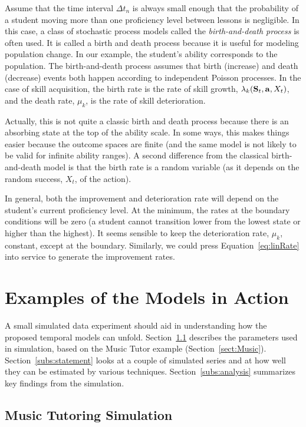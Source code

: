 \documentclass[12pt]{RR-article}
\begin{document}
Assume that the time interval $\Delta t_n$ is always small enough that
the probability of a student moving more than one proficiency level
between lessons is negligible.  In this case, a class of stochastic
process models called the \textit{birth-and-death process\/}
\cite{Ross1989} is often used.  It is called a birth and death process
because it is useful for modeling population change.  In our example,
the student's ability corresponds to the population.  The
birth-and-death process assumes that birth (increase) and death
(decrease) events both happen according to independent Poisson
processes.  In the case of skill acquisition, the birth rate is the
rate of skill growth, $\lambda_{k}({\bf S}_t,{\bf a}, X_t)$, and the
death rate, $\mu_k$, is the rate of skill deterioration.

Actually, this is not quite a classic birth and death process because
there is an absorbing state at the top of the ability scale.  In some
ways, this makes things easier because the outcome spaces are finite
(and the same model is not likely to be valid for infinite ability
ranges).  A second difference from the classical birth-and-death model
is that the birth rate is a random variable (as it depends on the
random success, $X_t$, of the action).

In general, both the improvement and deterioration rate will depend on
the student's current proficiency level.  At the minimum, the rates at
the boundary conditions will be zero (a student cannot transition
lower from the lowest state or higher than the highest).  It seems
sensible to keep the deterioration rate, $\mu_k$, constant, except at
the boundary.  Similarly, we could press Equation~\ref{eq:linRate}
into service to generate the improvement rates.

\section{Examples of the Models in Action}
\label{sect:Sim}

A small simulated data experiment should aid in understanding how the
proposed temporal models can unfold.  Section~\ref{subs:setup}
describes the parameters used in simulation, based on the Music Tutor
example (Section~\ref{sect:Music}).  Section~\ref{subs:statement}
looks at a couple of simulated series and at how well they can be
estimated by various techniques.  Section~\ref{subs:analysis}
summarizes key findings from the simulation.

\subsection{Music Tutoring Simulation}
\label{subs:setup}
\end{document}
